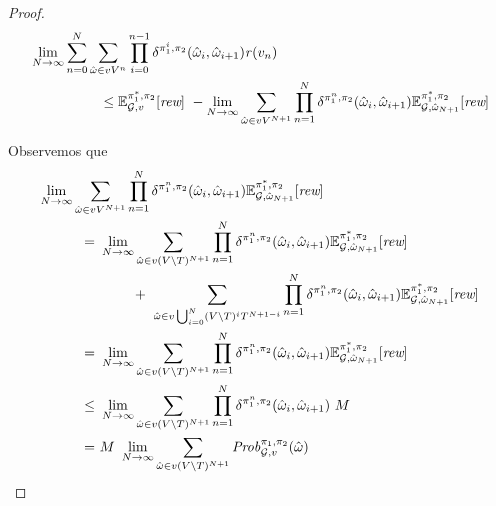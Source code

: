 \begin{proof}
  \begin{align}
    & \lim_{N \rightarrow \infty} \sum^{N}_{n=0}\sum_{\hat{\omega} \in vV^{n}} \prod^{n-1}_{i=0}\delta^{\pi_{1}^i,\pi_{2}}(\hat{\omega}_i, \hat{\omega}_{i+1}) \mathit{r}(v_n) \label{th:semimarkov-to-memoryless-eq0}\\
    & \hspace{5em} \leq 
      \mathbb{E}^{\pi^*_{1}, \pi_{2}}_{\mathcal{G},v}[\textit{rew}] \ - \lim_{N \rightarrow \infty} \sum_{\hat{\omega} \in vV^{N+1}}\prod^{N}_{n=1}\delta^{\pi_{1}^n,\pi_{2}}(\hat{\omega}_i,\hat{\omega}_{i+1}) \mathbb{E}^{\pi^*_{1}, \pi_{2}}_{\mathcal{G}, \hat{\omega}_{N+1}}[\textit{rew}] \notag
  \end{align}

  Observemos que
  \begin{align}
    \lim_{N \rightarrow \infty} \sum_{\hat{\omega} \in vV^{N+1}}\prod^{N}_{n=1}\delta^{\strat{1}^n,\strat{2}}(\hat{\omega}_i,\hat{\omega}_{i+1}) \Expect{\starredstrat{1}}{\strat{2}}_{\StochG, \hat{\omega}_{N+1}}[\Rewards] \hspace{-16em} & \notag \\
    = \ & \lim_{N \rightarrow \infty} \sum_{\hat{\omega} \in v(V\setminus T)^{N+1}}\prod^{N}_{n=1}\delta^{\strat{1}^n,\strat{2}}(\hat{\omega}_i,\hat{\omega}_{i+1}) \Expect{\starredstrat{1}}{\strat{2}}_{\StochG, \hat{\omega}_{N+1}}[\Rewards] \label{th:semimarkov-to-memoryless-lim-eq1}\\
    & \phantom{\lim_{N \rightarrow \infty}} + \
    \sum_{\hat{\omega} \in v\bigcup_{i=0}^N(V\setminus T)^iT^{N+1-i}}\prod^{N}_{n=1}\delta^{\strat{1}^n,\strat{2}}(\hat{\omega}_i,\hat{\omega}_{i+1}) \Expect{\starredstrat{1}}{\strat{2}}_{\StochG, \hat{\omega}_{N+1}}[\Rewards] \notag \\
    = \ & \lim_{N \rightarrow \infty} \sum_{\hat{\omega} \in v(V\setminus T)^{N+1}}\prod^{N}_{n=1}\delta^{\strat{1}^n,\strat{2}}(\hat{\omega}_i,\hat{\omega}_{i+1}) \Expect{\starredstrat{1}}{\strat{2}}_{\StochG, \hat{\omega}_{N+1}}[\Rewards] \label{th:semimarkov-to-memoryless-lim-eq2}\\
    \leq \ & \lim_{N \rightarrow \infty} \sum_{\hat{\omega} \in v(V\setminus T)^{N+1}}\prod^{N}_{n=1}\delta^{\strat{1}^n,\strat{2}}(\hat{\omega}_i,\hat{\omega}_{i+1}) \ M \label{th:semimarkov-to-memoryless-lim-eq3}\\
    = \ & M \ \lim_{N \rightarrow \infty} \sum_{\hat{\omega} \in v(V\setminus T)^{N+1}} \Prob{\strat{1}}{\strat{2}}_{\StochG,v}(\hat{\omega}) \label{th:semimarkov-to-memoryless-lim-eq4}\\

\end{align}
\end{proof}
